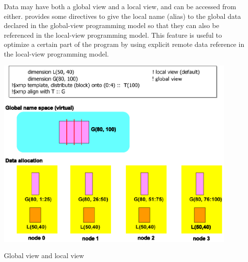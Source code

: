 Data may have both a global view and a local view, and can be accessed
from either. {\XMP} provides some directives to give the local name
(alias) to the global data declared in the global-view programming model
so that they can also be referenced in the local-view programming
model. This feature is useful to optimize a certain part of the program
by using explicit remote data reference in the local-view programming
model.

\begin{myfigure}
\includegraphics[width=12cm]{figs/Fig4.eps}
  \caption{Global view and local view}
\label{fig4}
\end{myfigure}

